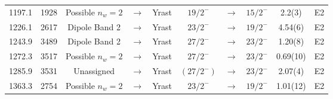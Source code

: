\begin{landscape}
\begin{center}
\begin{longtable}{|c|c|ccc|ccc|c|c|}
 1197.1&1928&Possible $n_w=2$&$ \rightarrow $&Yrast&$ 19/2^{-} $&$ \rightarrow $&$ 15/2^{-} $& 2.2(3)& E2 \\
 1226.1&2617&Dipole Band 2&$ \rightarrow $&Yrast&$ 23/2^{-} $&$ \rightarrow $&$ 19/2^{-} $& 4.54(6)& E2 \\
 1243.9&3489&Dipole Band 2&$ \rightarrow $&Yrast&$ 27/2^{-} $&$ \rightarrow $&$ 23/2^{-} $& 1.20(8)& E2 \\
 1272.3&3517&Possible $n_w=2$&$ \rightarrow $&Yrast&$ 27/2^{-} $&$ \rightarrow $&$ 23/2^{-} $& 0.69(10)& E2 \\
 1285.9&3531&Unassigned&$ \rightarrow $&Yrast&$ (27/2^{-}) $&$ \rightarrow $&$ 23/2^{-} $& 2.07(4)& E2 \\
 1363.3&2754&Possible $n_w=2$&$ \rightarrow $&Yrast&$ 23/2^{-} $&$ \rightarrow $&$ 19/2^{-} $& 1.01(12)& E2 \\
\end{longtable}
\end{center}
\end{landscape}